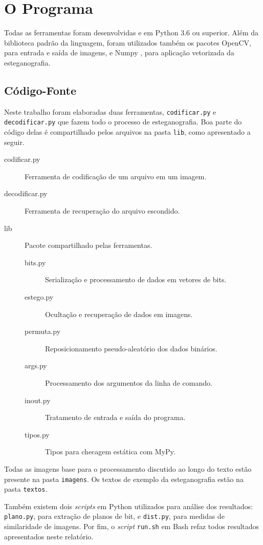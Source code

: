 \section{O Programa}

Todas as ferramentas foram desenvolvidas e  em Python 3.6 ou superior. Além da biblioteca padrão da linguagem, foram utilizados também os pacotes OpenCV, para entrada e saída de imagens, e Numpy , para aplicação vetorizada da esteganografia.

\subsection{Código-Fonte}

    Neste trabalho foram elaboradas duas ferramentas, \texttt{codificar.py} e \texttt{decodificar.py} que fazem todo o processo de esteganografia. Boa parte do código delas é compartilhado pelos arquivos na pasta \texttt{lib}, como apresentado a seguir.

    \begin{description}
        \item[codificar.py] Ferramenta de codificação de um arquivo em um imagem.

        \item[decodificar.py] Ferramenta de recuperação do arquivo escondido.

        \item[lib] Pacote compartilhado pelas ferramentas.

        \begin{description}
            \item[bits.py] Serialização e processamento de dados em vetores de bits.

            \item[estego.py] Ocultação e recuperação de dados em imagens.

            \item[permuta.py] Reposicionamento pseudo-aleatório dos dados binários.

            \item[args.py] Processamento dos argumentos da linha de comando.

            \item[inout.py] Tratamento de entrada e saída do programa.

            \item[tipos.py] Tipos para checagem estática com MyPy.
        \end{description}
    \end{description}

    Todas as imagens base para o processamento discutido ao longo do texto estão presente na pasta \texttt{imagens}. Os textos de exemplo da esteganografia estão na pasta \texttt{textos}.

    Também existem dois \textit{scripts} em Python utilizados para análise dos resultados: \texttt{plano.py}, para extração de planos de bit, e \texttt{dist.py}, para medidas de similaridade de imagens. Por fim, o \textit{script} \texttt{run.sh} em Bash refaz todos resultados apresentados neste relatório.